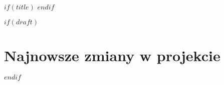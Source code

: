 $if(title)$
$endif$

$if(draft)$
\clearpage

\section*{Najnowsze zmiany w projekcie}
\thispagestyle{empty}
$endif$

\maketitle
\makeinfo
\makeabstracts

\thispagestyle{empty}
\cleartooddpage
\tableofcontents

\cleartooddpage
